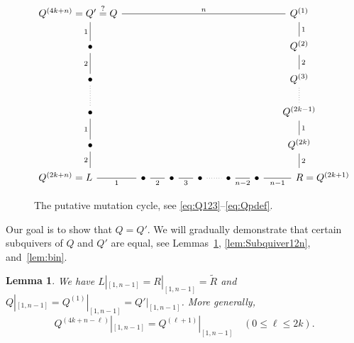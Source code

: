 \documentclass[11pt, letterpaper]{amsart}
\newtheorem{lemma}[theorem]{Lemma}
\theoremstyle{definition}
\numberwithin{equation}{section}
\begin{document}
\begin{figure}[ht]
\vspace{-.2in}
\begin{equation*}
\quad \begin{tikzcd}[arrows={-stealth}, sep=15]
\hspace{-.34in}%
Q^{(4k+n)}=Q' \ar[d, swap, no head, "1"] %
\stackrel{?}{=}  Q  %
 \arrow[rrrrrr, no head, "n"] &
                                                                    &&&&& Q^{(1)} \arrow[d, no head, "1"] \\
\bullet \arrow[d, swap, no head,"2"] &&&&&&  Q^{(2)} \arrow[d, no head,"2"]  \\
\bullet \arrow[d, swap, no head,dotted]  &&&&&&  Q^{(3)} \arrow[d, no head,dotted]  \\
\bullet \arrow[d, swap, no head,"1"] &&&&&&  Q^{(2k-1)} \arrow[d, no head,"1"]  \\
\bullet \arrow[d, swap, no head,"2"] &&&&&&  Q^{(2k)} \arrow[d, no head,"2"]  \\
\hspace{-.69in}Q^{(2k+n)}=L \arrow[r, swap, no head, "1"] 
    & \bullet \arrow[r, swap, no head, "2" ] 
    & \bullet \arrow[r, swap, no head,"3"] 
    & \bullet \arrow[r, dotted, no head] & \bullet \arrow[r, swap, no head,"n-2"] 
         & \bullet \arrow[r, swap, no head,"n-1"] & R=Q^{(2k+1)} \hspace{-.65in}
\end{tikzcd}
\end{equation*}
\vspace{-.1in}
\caption{The putative mutation cycle, see \eqref{eq:Q123}--\eqref{eq:Qpdef}. 
}
\label{fig:GeneralSemiCycles-notation}
\end{figure}

Our goal is to show that $Q = Q'$. 
We will gradually demonstrate that certain subquivers of $Q$ and $Q'$ are equal,
see Lemmas~\ref{lem:SubquiverTildeQ}, \ref{lem:Subquiver12n}, and~\ref{lem:bin}. 


\begin{lemma}
\label{lem:SubquiverTildeQ} 
We have $L|_{[1,n-1]}\!=\!R|_{[1, n-1]}\!=\!\tilde R$ and $Q|_{[1,n-1]}\!=\!Q^{(1)}|_{[1,n-1]}\!=\!Q'|_{[1, n-1]}$.
More generally, 
\begin{equation}
\label{eq:SubquiverTildeQ-2}
Q^{(4k+n-\ell)}|_{[1,n-1]} = Q^{(\ell+1)}|_{[1,n-1]} \quad (0 \leq \ell \leq 2k). 
\end{equation}

\end{lemma}
\end{document}

